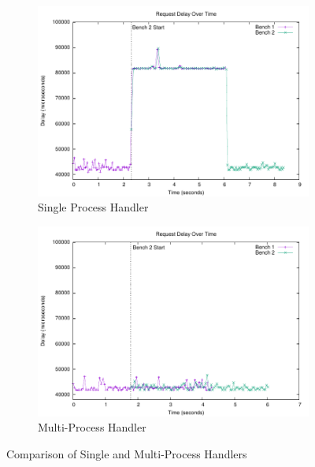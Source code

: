 \documentclass[a4paper, 11pt]{article}
\begin{document}
\begin{figure}[H]
  \begin{center}
    \begin{subfigure}[b]{0.494\textwidth}
      \centering
      \includegraphics[width=\textwidth]{graphs/requests-single-process/requests.pdf}
      \caption{Single Process Handler}
      \label{fig:results1}
    \end{subfigure}
    \hfill
    \begin{subfigure}[b]{0.494\textwidth}
      \centering
      \includegraphics[width=\textwidth]{graphs/requests-multi-process/requests.pdf}
      \caption{Multi-Process Handler}
      \label{fig:results2}
    \end{subfigure}
  \end{center}
  \caption{Comparison of Single and Multi-Process Handlers}
  \label{fig:comparison}
\end{figure}
\end{document}
